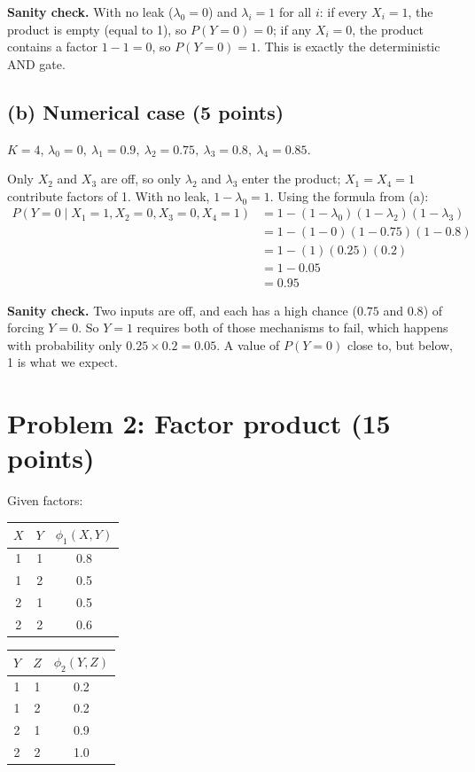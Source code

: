\documentclass[11pt]{article}
\begin{document}
\textbf{Sanity check.} With no leak ($\lambda_0 = 0$) and $\lambda_i = 1$ for
all $i$: if every $X_i = 1$, the product is empty (equal to 1), so
$P(Y = 0) = 0$; if any $X_i = 0$, the product contains a factor $1 - 1 = 0$,
so $P(Y = 0) = 1$. This is exactly the deterministic AND gate.

\subsection*{(b) Numerical case (5 points)}

$K = 4$, \quad $\lambda_0 = 0,\ \lambda_1 = 0.9,\ \lambda_2 = 0.75,\
\lambda_3 = 0.8,\ \lambda_4 = 0.85$.

Only $X_2$ and $X_3$ are off, so only $\lambda_2$ and $\lambda_3$ enter the
product; $X_1 = X_4 = 1$ contribute factors of 1. With no leak,
$1 - \lambda_0 = 1$. Using the formula from (a):
\begin{align*}
  P(Y = 0 \mid X_1 = 1, X_2 = 0, X_3 = 0, X_4 = 1)
  &= 1 - (1 - \lambda_0)(1 - \lambda_2)(1 - \lambda_3) \\
  &= 1 - (1 - 0)(1 - 0.75)(1 - 0.8) \\
  &= 1 - (1)(0.25)(0.2) \\
  &= 1 - 0.05 \\
  &= \boxed{0.95}
\end{align*}

\textbf{Sanity check.} Two inputs are off, and each has a high chance
($0.75$ and $0.8$) of forcing $Y = 0$. So $Y = 1$ requires both of those
mechanisms to fail, which happens with probability only
$0.25 \times 0.2 = 0.05$. A value of $P(Y = 0)$ close to, but below, 1 is what
we expect.

\section*{Problem 2: Factor product (15 points)}

Given factors:
\begin{center}
\begin{tabular}{cc|c}
  \toprule
  $X$ & $Y$ & $\phi_1(X,Y)$ \\
  \midrule
  1 & 1 & 0.8 \\
  1 & 2 & 0.5 \\
  2 & 1 & 0.5 \\
  2 & 2 & 0.6 \\
  \bottomrule
\end{tabular}
\qquad
\begin{tabular}{cc|c}
  \toprule
  $Y$ & $Z$ & $\phi_2(Y,Z)$ \\
  \midrule
  1 & 1 & 0.2 \\
  1 & 2 & 0.2 \\
  2 & 1 & 0.9 \\
  2 & 2 & 1.0 \\
  \bottomrule
\end{tabular}
\end{center}
\end{document}
